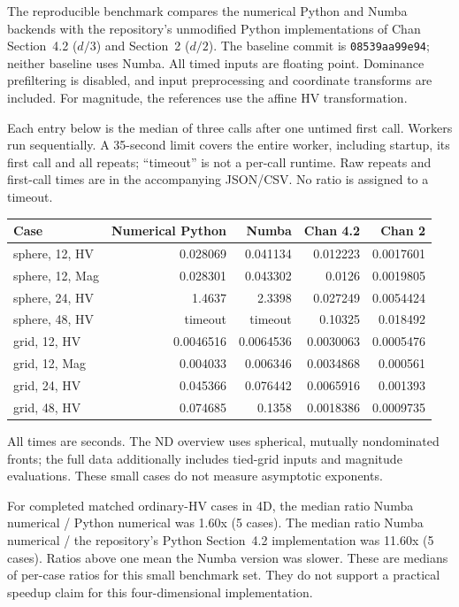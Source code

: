 The reproducible benchmark compares the numerical Python and Numba
backends with the repository's unmodified Python implementations of Chan
Section~4.2 ($d/3$) and Section~2 ($d/2$). The baseline commit is
\texttt{08539aa99e94}; neither baseline uses Numba. All timed inputs are
floating point. Dominance prefiltering is disabled, and input preprocessing
and coordinate transforms are included. For magnitude, the references use
the affine HV transformation.

Each entry below is the median of three calls after one untimed first call.
Workers run sequentially. A 35-second limit covers the entire worker,
including startup, its first call and all repeats; ``timeout'' is not a
per-call runtime. Raw repeats and first-call times are in the accompanying
JSON/CSV. No ratio is assigned to a timeout.

\begin{center}\small
\begin{tabular}{@{}lrrrr@{}}
\toprule
Case&Numerical Python&Numba&Chan 4.2&Chan 2\\
\midrule
sphere, 12, HV&0.028069&0.041134&0.012223&0.0017601\\
sphere, 12, Mag&0.028301&0.043302&0.0126&0.0019805\\
sphere, 24, HV&1.4637&2.3398&0.027249&0.0054424\\
sphere, 48, HV&timeout&timeout&0.10325&0.018492\\
grid, 12, HV&0.0046516&0.0064536&0.0030063&0.0005476\\
grid, 12, Mag&0.004033&0.006346&0.0034868&0.000561\\
grid, 24, HV&0.045366&0.076442&0.0065916&0.001393\\
grid, 48, HV&0.074685&0.1358&0.0018386&0.0009735\\
\bottomrule
\end{tabular}
\end{center}
All times are seconds. The ND overview uses spherical, mutually
nondominated fronts; the full data additionally includes tied-grid inputs
and magnitude evaluations. These small cases do not measure asymptotic exponents.

For completed matched ordinary-HV cases in 4D, the median ratio Numba numerical / Python numerical was 1.60x (5 cases). The median ratio Numba numerical / the repository's Python Section~4.2 implementation was 11.60x (5 cases). Ratios above one mean the Numba version was slower. These are medians of per-case ratios for this small benchmark set. They do not support a practical speedup claim for this four-dimensional implementation.


